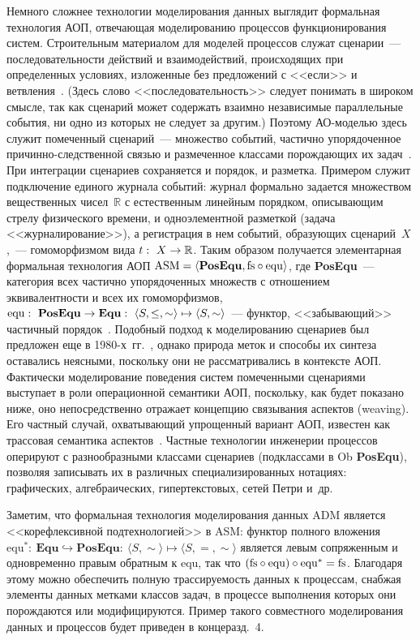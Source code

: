 \begin{multicols}{2}
    Немного сложнее технологии моделирования данных выглядит формальная 
технология АОП, отвечающая моделированию процессов функционирования систем. 
Строительным материалом для моделей процессов служат сценарии~--- 
последовательности действий и взаимодействий, происходящих при определенных 
условиях, изложенные без предложений с <<если>> и ветвления~\cite{19-kov}. 
(Здесь слово <<последовательность>> следует понимать в широком смысле, так как 
сценарий может содержать взаимно независимые параллельные события, ни одно из 
которых не следует за другим.) Поэтому АО-мо\-делью здесь служит помеченный 
сценарий~--- множество событий, частично упорядоченное причинно-следственной 
связью и размеченное классами порождающих их задач~\cite{14-kov, 20-kov}. При 
интеграции сценариев сохраняется и порядок, и разметка. Примером служит 
подключение единого журнала событий: журнал формально задается множеством 
вещественных чисел~$\mathbb{R}$ с естественным линейным порядком, описывающим 
стрелу физического времени, и одноэлементной разметкой (задача 
<<журналирование>>), а регистрация в нем событий, образующих сценарий~$X$,~--- 
гомоморфизмом вида $t:\ X\hm\rightarrow\mathbb{R}$. Таким образом получается 
элементарная формальная технология АОП $\mathrm{ASM}\hm = \langle \mathbf{PosEqu}, \mathrm{fs} 
\circ \mathrm{equ}\rangle$, где \textbf{PosEqu}~--- категория всех частично 
упорядоченных множеств с отношением эквивалентности и всех их гомоморфизмов, 
$\mathrm{equ}:\ \mathbf{PosEqu}\hm\rightarrow \mathbf{Equ}:\ \langle S, \leq, 
\sim\rangle \mapsto \langle S, \sim\rangle$~--- функтор, <<забывающий>> 
частичный порядок~\cite{13-kov}. Подобный подход к моделированию сценариев был 
предложен еще в 1980-х~гг.~\cite{21-kov}, однако природа меток и способы их 
синтеза оставались неясными, поскольку они не рассматривались в контексте АОП. 
Фактически моделирование поведения сис\-тем помеченными сценариями выступает в 
роли операционной семантики АОП, поскольку, как будет показано ниже, оно 
непосредственно отражает концепцию связывания аспектов (weaving). Его частный 
случай, охватывающий упрощенный вариант АОП, известен как трассовая семантика 
аспектов~\cite{22-kov}. Частные технологии инженерии процессов оперируют с 
разнообразными классами сценариев (подклассами в Ob \textbf{PosEqu}), позволяя 
записывать их в различных специализированных нотациях: графических, 
алгебраических, гипертекстовых, сетей Петри и~др.
   
   Заметим, что формальная технология моделирования данных ADM 
является <<корефлексивной подтехнологией>> в ASM: функтор полного вложения 
$\mathrm{equ}^*:\ \mathbf{Equ} \hookrightarrow \mathbf{PosEqu}:\ \langle S, 
\sim\rangle\mapsto \langle S, =, \sim\rangle$ является левым сопряженным и 
одновременно правым обратным к equ, так что $(\mathrm{fs} \circ \mathrm{equ}) \circ 
\mathrm{equ}^* \hm=  \mathrm{fs}$. Благодаря этому можно обеспечить полную трассируемость данных к процессам, 
снабжая элементы данных метками классов задач, в процессе выполнения которых 
они порождаются или модифицируются. Пример такого совместного моделирования 
данных и процессов будет приведен в конце\linebreak разд.~4.
   

\end{multicols}
